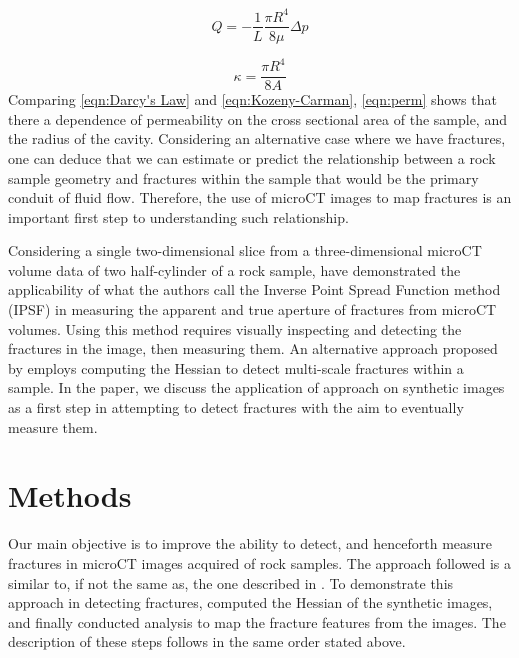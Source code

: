 \documentclass[usletter, 11pt, titlepage]{article}
\begin{document}
\begin{equation}
Q = - \frac{1}{L} \frac{\pi R^4}{8\mu} \Delta p \label{eqn:Kozeny-Carman}
\end{equation}

\begin{equation}
\kappa = \frac{\pi R^4}{8A} \label{eqn:perm}
\end{equation}
Comparing \autoref{eqn:Darcy's Law} and \autoref{eqn:Kozeny-Carman}, \autoref{eqn:perm} shows that there a dependence of permeability on the cross sectional area of the sample, and the radius of the cavity. Considering an alternative case where we have fractures, one can deduce that we can estimate or predict the relationship between a rock sample geometry and fractures within the sample that would be the primary conduit of fluid flow. Therefore, the use of microCT images to map fractures is an important first step to understanding such relationship. 

Considering a single two-dimensional slice from a three-dimensional microCT volume data of two half-cylinder of a rock sample, \cite{Ketcham2010} have demonstrated the applicability of what the authors call the Inverse Point Spread Function method (IPSF) in measuring the apparent and true aperture of fractures from microCT volumes. Using this method requires visually inspecting and detecting the fractures in the image, then measuring them. An alternative approach proposed by \cite{Voorn2013} employs computing the Hessian to detect multi-scale fractures within a sample. In the paper, we discuss the application of \cite{Voorn2013} approach on synthetic images as a first step in attempting to detect fractures with the aim to eventually measure them. 

\section{Methods}
Our main objective is to improve the ability to detect, and henceforth measure fractures in microCT images acquired of rock samples. The approach followed is a similar to, if not the same as, the one described in \cite{Voorn2013}. To demonstrate this approach in detecting fractures, computed the Hessian of the synthetic images, and finally conducted analysis to map the fracture features from the images. The description of these steps follows in the same order stated above. 
\end{document}
